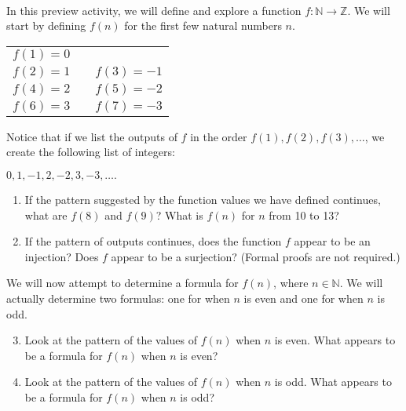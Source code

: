 
%
\begin{previewactivity}\label{PA:functionNtoZ} \hfill \\
In this preview activity, we will define and explore a function $f:\mathbb{N} \to \mathbb{Z}$.  We will start by defining $f ( n )$ for the first few natural numbers $n$.

\begin{center}
\begin{tabular}[h]{l p{2cm} l}
$f ( 1 ) = 0$  &  &  \\
$f ( 2 ) = 1$  &  &  $f ( 3 ) = -1$ \\
$f ( 4 ) = 2$  &  &  $f ( 5 ) = -2$ \\
$f ( 6 ) = 3$  &  &  $f ( 7 ) = -3$\\
\end{tabular}
\end{center}

Notice that if we list the outputs of $f$ in the order 
$f ( 1 ), f ( 2 ), f ( 3 ), \ldots$,  we create the following list of integers:
\begin{center}
$0, 1, -1, 2, -2, 3, -3, \ldots .$
\end{center}

\begin{enumerate}
\item If the pattern suggested by the function values we have defined continues, what are 
$f ( 8 )$ and $f ( 9 )$?  What is $f ( n )$ for $n$ from 10 to 13? 
\label{PA:functionNtoZ1}%

\item If the pattern of outputs continues, does the function $f$ appear to be an injection?  Does $f$ appear to be a surjection?  (Formal proofs are not required.)
\end{enumerate}

We will now attempt to determine a formula for $f ( n )$, where $n \in \mathbb{N}$.  We will actually determine two formulas:  one for when $n$ is even and one for when $n$ is odd.

\begin{enumerate} \setcounter{enumi}{2}
\item Look at the pattern of the values of $f ( n )$ when $n$ is even.  What appears to be a formula for $f ( n )$ when $n$ is even? 
\label{PA:functionNtoZ3}%

\item Look at the pattern of the values of $f ( n )$ when $n$ is odd.  What appears to be a formula for $f ( n )$ when $n$ is odd? 
\label{PA:functionNtoZ4}%


\end{enumerate}
\end{previewactivity}
